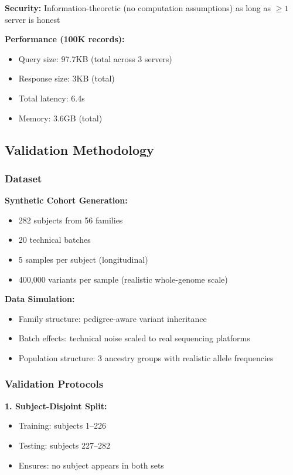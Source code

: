 \documentclass[11pt,letterpaper]{article}
\begin{document}
\textbf{Security:} Information-theoretic (no computation assumptions) as long as $\geq 1$ server is honest

\textbf{Performance (100K records):}
\begin{itemize}
\item Query size: 97.7KB (total across 3 servers)
\item Response size: 3KB (total)
\item Total latency: 6.4s
\item Memory: 3.6GB (total)
\end{itemize}

\subsection{Validation Methodology}

\subsubsection{Dataset}

\textbf{Synthetic Cohort Generation:}
\begin{itemize}
\item 282 subjects from 56 families
\item 20 technical batches
\item 5 samples per subject (longitudinal)
\item 400,000 variants per sample (realistic whole-genome scale)
\end{itemize}

\textbf{Data Simulation:}
\begin{itemize}
\item Family structure: pedigree-aware variant inheritance
\item Batch effects: technical noise scaled to real sequencing platforms
\item Population structure: 3 ancestry groups with realistic allele frequencies
\end{itemize}

\subsubsection{Validation Protocols}

\textbf{1. Subject-Disjoint Split:}
\begin{itemize}
\item Training: subjects 1--226
\item Testing: subjects 227--282
\item Ensures: no subject appears in both sets
\end{itemize}
\end{document}
